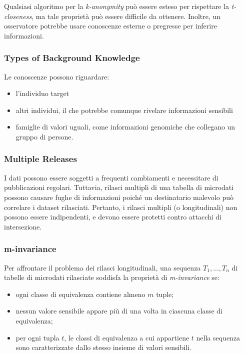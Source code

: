 \documentclass{report}
\begin{document}
\noindent Qualsiasi algoritmo per la \textit{k-anonymity} può essere esteso per rispettare la \textit{t-closeness}, ma tale proprietà può essere difficile da ottenere. 
Inoltre, un osservatore potrebbe usare conoscenze esterne o pregresse per inferire informazioni.

\subsubsection{Types of Background Knowledge}
Le conoscenze possono riguardare:
\begin{itemize}
    \item l'individuo target
    \item altri individui, il che potrebbe comunque rivelare informazioni sensibili
    \item famiglie di valori uguali, come informazioni genomiche che collegano un gruppo di persone.
\end{itemize}

\subsubsection{Multiple Releases}
I dati possono essere soggetti a frequenti cambiamenti e necessitare di pubblicazioni regolari. 
Tuttavia, rilasci multipli di una tabella di microdati possono causare fughe di informazioni poiché un destinatario malevolo può correlare i dataset rilasciati.
 Pertanto, i rilasci multipli (o longitudinali) non possono essere indipendenti, e devono essere protetti contro attacchi di intersezione.

\subsubsection{m-invariance}
Per affrontare il problema dei rilasci longitudinali, una sequenza $T_1, ..., T_n$ di tabelle di microdati rilasciate soddisfa la proprietà di \textit{m-invariance} se:

\begin{itemize}
    \item ogni classe di equivalenza contiene almeno $m$ tuple;
    \item nessun valore sensibile appare più di una volta in ciascuna classe di equivalenza;
    \item per ogni tupla $t$, le classi di equivalenza a cui appartiene $t$ nella sequenza sono caratterizzate dallo stesso insieme di valori sensibili.
\end{itemize}
\end{document}
